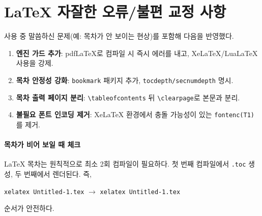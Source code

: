 \documentclass[11pt,a4paper]{article}
\begin{document}
\section{LaTeX 자잘한 오류/불편 교정 사항}
사용 중 말씀하신 문제(예: 목차가 안 보이는 현상)를 포함해 다음을 반영했다.
\begin{enumerate}
  \item \textbf{엔진 가드 추가}: pdfLaTeX로 컴파일 시 즉시 에러를 내고, XeLaTeX/LuaLaTeX 사용을 강제.
  \item \textbf{목차 안정성 강화}: \texttt{bookmark} 패키지 추가, \texttt{tocdepth/secnumdepth} 명시.
  \item \textbf{목차 출력 페이지 분리}: \texttt{\textbackslash tableofcontents} 뒤 \texttt{\textbackslash clearpage}로 본문과 분리.
  \item \textbf{불필요 폰트 인코딩 제거}: XeLaTeX 환경에서 충돌 가능성이 있는 \texttt{fontenc(T1)}를 제거.
\end{enumerate}

\paragraph{목차가 비어 보일 때 체크}
LaTeX 목차는 원칙적으로 최소 2회 컴파일이 필요하다.
첫 번째 컴파일에서 \texttt{.toc} 생성, 두 번째에서 렌더된다.
즉,
\begin{center}
\texttt{xelatex Untitled-1.tex} \;\(\rightarrow\)\; \texttt{xelatex Untitled-1.tex}
\end{center}
순서가 안전하다.
\end{document}

